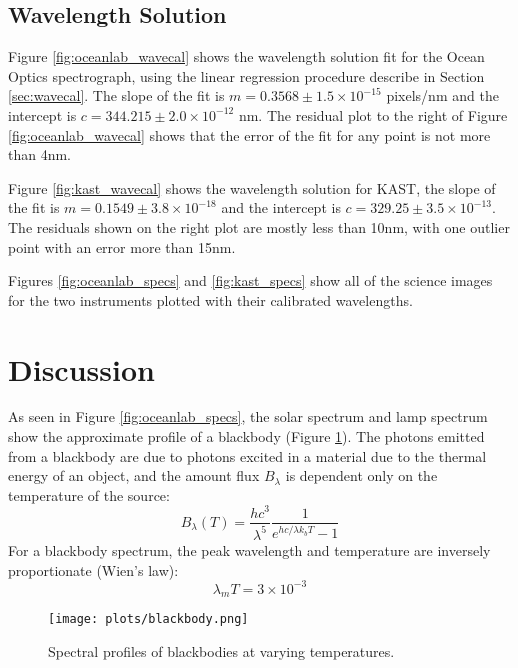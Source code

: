 \documentclass[preprint]{aastex62}
\begin{document}
\newpage
\subsection{Wavelength Solution}
Figure \ref{fig:oceanlab_wavecal} shows the wavelength solution fit for the Ocean Optics spectrograph, using the linear regression procedure describe in Section \ref{sec:wavecal}. The slope of the fit is $m=0.3568 \pm 1.5\times10^{-15}$ pixels/nm and the intercept is $c=344.215 \pm 2.0\times10^{-12}$ nm. The residual plot to the right of Figure \ref{fig:oceanlab_wavecal} shows that the error of the fit for any point is not more than 4nm.

Figure \ref{fig:kast_wavecal} shows the wavelength solution for KAST, the slope of the fit is $m=0.1549 \pm 3.8\times10^{-18}$ and the intercept is $c=329.25 \pm 3.5\times10^{-13}$. The residuals shown on the right plot are mostly less than 10nm, with one outlier point with an error more than 15nm.

Figures \ref{fig:oceanlab_specs} and \ref{fig:kast_specs} show all of the science images for the two instruments plotted with their calibrated wavelengths.

\section{Discussion} \label{sec:discussion}
As seen in Figure \ref{fig:oceanlab_specs}, the solar spectrum and lamp spectrum show the approximate profile of a blackbody (Figure \ref{fig:blackbody}). The photons emitted from a blackbody are due to photons excited in a material due to the thermal energy of an object, and the amount flux $B_\lambda$ is dependent only on the temperature of the source:
\begin{equation}
    B_{\lambda}(T) = \frac{hc^3}{\lambda^5}\frac{1}{e^{hc/\lambda k_b T} - 1}
\end{equation}
For a blackbody spectrum, the peak wavelength and temperature are inversely proportionate (Wien's law):
\begin{equation}
    \lambda_m T = 3\times10^{-3}
\end{equation}

\begin{figure}[H]
\begin{center}
\texttt{[image: plots/blackbody.png]}
\caption{Spectral profiles of blackbodies at varying temperatures.} \label{fig:blackbody}
\end{center}
\end{figure}
\end{document}
